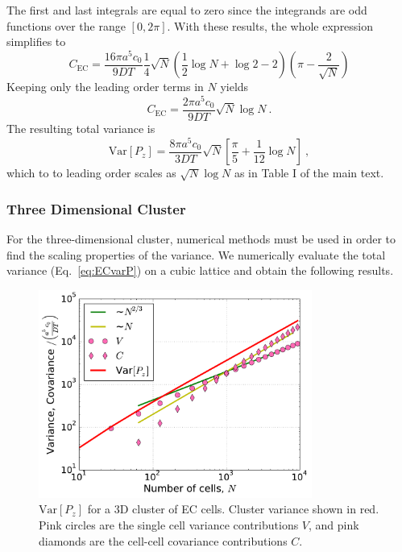 The first and last integrals are equal to zero since the integrands are odd functions over the range $[0,2\pi]$. With these results, the whole expression simplifies to
\begin{equation}
    C_\text{EC} = \frac{16\pi a^5c_0}{9DT} \frac{1}{4}\sqrt{N} \left( \frac{1}{2}\log N + \log 2 -2 \right) \left( \pi - \frac{2}{\sqrt{N}} \right)
\end{equation}
Keeping only the leading order terms in $N$ yields
\begin{equation}
    C_\text{EC} = \frac{2\pi a^5c_0}{9DT} \sqrt{N} \log N \ .
\end{equation}
The resulting total variance is
\begin{equation}
    \text{Var}[P_z] = \frac{8\pi a^5c_0}{3DT} \sqrt{N} \left[ \frac{\pi}{5} +  \frac{1}{12} \log N \right] \ ,
\end{equation}
which to to leading order scales as $\sqrt{N} \log N$ as in Table I of the main text.


\subsubsection{Three Dimensional Cluster}

For the three-dimensional cluster, numerical methods must be used in order to find the scaling properties of the variance. We numerically evaluate the total variance (Eq.\ \ref{eq:ECvarP}) on a cubic lattice and obtain the following results.

\begin{figure}[ht]
    \centering
        \includegraphics[width=0.8\textwidth]{../fig/ch3_si2.pdf}
    \caption{$\text{Var}[P_z]$ for a 3D cluster of EC cells. Cluster variance shown in red. Pink circles are the single cell variance contributions $V$, and pink diamonds are the cell-cell covariance contributions $C$.} \label{fig:ch3_4}
\end{figure}

